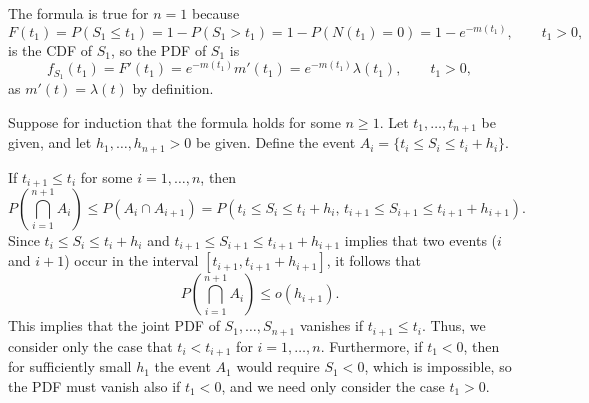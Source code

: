 \documentclass{homework}
\begin{document}
	\begin{alphaparts}
		\questionpart The formula is true for $n = 1$ because
		\begin{equation*}
			F(t_1) = P(S_1 \le t_1) = 1 - P(S_1 > t_1) = 1 - P(N(t_1) = 0) = 1 - e^{-m(t_1)}, \qquad t_1 > 0,
		\end{equation*}
		is the CDF of $S_1$, so the PDF of $S_1$ is
		\begin{equation*}
			f_{S_1}(t_1) = F'(t_1) = e^{-m(t_1)}m'(t_1) = e^{-m(t_1)}\lambda(t_1), \qquad t_1 > 0,
		\end{equation*}
		as $m'(t) = \lambda(t)$ by definition. 
		
		Suppose for induction that the formula holds for some $n \ge 1$. Let $t_1, \dots, t_{n+1}$ be given, and let $h_1,\dots, h_{n+1} > 0$ be given. Define the event $A_i = \{t_i \le S_i \le t_i + h_i\}$. 
		
		If $t_{i+1} \le t_i$ for some $i=1,\dots, n$, then
		\begin{equation*}
			P\left(\bigcap_{i=1}^{n+1}A_i\right) \le P(A_i \cap A_{i+1}) = P(t_i \le S_i \le t_i + h_i,\, t_{i+1}\le S_{i+1}\le t_{i+1}+h_{i+1}).
		\end{equation*}
		Since $t_i \le S_i \le t_i+h_i$ and $t_{i+1} \le S_{i+1} \le t_{i+1} + h_{i+1}$ implies that two events ($i$ and $i+1$) occur in the interval $[t_{i+1}, t_{i+1}+h_{i+1}]$, it follows that
		\begin{equation*}
			P\left(\bigcap_{i=1}^{n+1}A_i\right)\le o(h_{i+1}).
		\end{equation*}
		This implies that the joint PDF of $S_1, \dots, S_{n+1}$ vanishes if $t_{i+1} \le t_i$. Thus, we consider only the case that $t_i < t_{i+1}$ for $i=1,\dots, n$. Furthermore, if $t_1 < 0$, then for sufficiently small $h_1$ the event $A_1$ would require $S_1 < 0$, which is impossible, so the PDF must vanish also if $t_1 < 0$, and we need only consider the case $t_1 > 0$.
		

\end{alphaparts}
\end{document}
